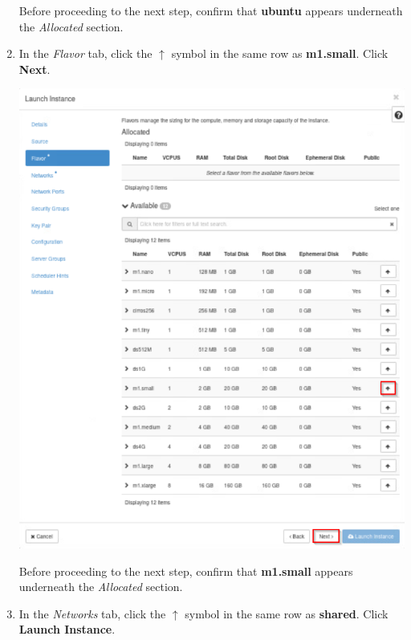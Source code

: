 \documentclass[letterpaper, 12pt]{article}
\begin{document}
\begin{enumerate}
    \begin{stopbox}
        Before proceeding to the next step, confirm that \textbf{ubuntu} appears underneath the \textit{Allocated} section.
    \end{stopbox}

    \item In the \textit{Flavor} tab, click the $\uparrow$ symbol in the same row as \textbf{m1.small}.
    Click \textbf{Next}.

    \begin{center}
        \includegraphics[width=\linewidth]{images/part1/step7.png}
    \end{center}

    \begin{stopbox}
        Before proceeding to the next step, confirm that \textbf{m1.small} appears underneath the \textit{Allocated} section.
    \end{stopbox}

    \item In the \textit{Networks} tab, click the $\uparrow$ symbol in the same row as \textbf{shared}.
    Click \textbf{Launch Instance}.


\end{enumerate}
\end{document}
